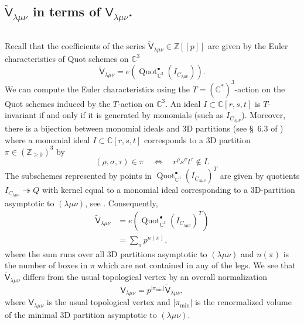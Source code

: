 \documentclass[12pt]{amsart}
\theoremstyle{definition}
\newcommand{\CC} {\mathbb{C}}          %
\newcommand{\ZZ} {\mathbb{Z}}		%
\newcommand{\sfV}{\mathsf{V}}
\newcommand{\sfVtilde}{\widetilde{\mathsf{V}}}
\newcommand{\Quot}{\operatorname{Quot}}
\newcommand{\SubSecSpace}{$\,$\vspace{0.2cm}\par } %
\begin{document}
\subsection{$\sfVtilde_{\lambda \mu \nu}$ in terms of $\sfV_{\lambda
\mu \nu}$.}\SubSecSpace 

Recall that the coefficients of the series $\sfVtilde_{\lambda \mu \nu}\in \ZZ [[p]]$ are
given by the Euler characteristics of Quot schemes on $\CC^3$
\[
\sfVtilde_{\lambda \mu \nu} =
e\left(\Quot^{\bullet}_{\CC^3}(I_{C_{\lambda \mu \nu}})\right). 
\]
We can compute the Euler characteristics using the $T=(\CC^{*})^{3}$-action on the Quot schemes induced by the $T$-action on
$\CC^{3}$. An ideal $I\subset \CC [r,s,t]$ is $T$-invariant if and
only if it is generated by monomials (such as $I_{C_{\lambda \mu \nu}}$). Moreover, there is a bijection
between monomial ideals and 3D partitions (see \S~6.3 of
\cite{Bryan-Kool-Young}) where a monomial ideal $I\subset \CC[r,s,t]$
corresponds to a 3D partition $\pi \in \left(\ZZ_{\geq 0} \right)^{3}$
by
\[
(\rho ,\sigma ,\tau )\in \pi  \quad \Longleftrightarrow\quad 
r^{\rho}s^{\sigma}t^{\tau} \notin I.
\]
The subschemes represented by points in
$\Quot^{\bullet}_{\CC^3}(I_{C_{\lambda \mu \nu}})^T$ are given by quotients $I_{C_{\lambda \mu \nu}} \twoheadrightarrow Q$ with kernel equal to a monomial ideal corresponding to a 3D-partition
asymptotic to $(\lambda \mu \nu )$, see
\cite[Defn~1]{Bryan-Kool-Young}. Consequently, 
\begin{align*}
\sfVtilde_{\lambda \mu \nu}& = e\left(\Quot^{\bullet}_{\CC^3}(I_{C_{\lambda \mu \nu}})^T\right)\\
&=\sum_{\pi} p^{n(\pi )},
\end{align*}
where the sum runs over all 3D partitions asymptotic to $(\lambda \mu
\nu )$ and $n(\pi )$ is the number of boxes in $\pi$ which are not
contained in any of the legs. We see that $\sfVtilde_{\lambda \mu
\nu}$ differs from the usual topological vertex by an overall
normalization
\[
\sfV_{\lambda \mu \nu} = p^{|\pi_{\min}|} \sfVtilde_{\lambda \mu \nu},
\]
where $\sfV_{\lambda \mu \nu }$ is the usual topological vertex
\cite[Defn~2]{Bryan-Kool-Young} and $|\pi_{\min}|$ is the renormalized
volume \cite[page~2]{Bryan-Kool-Young} of the minimal 3D partition asymptotic to $(\lambda \mu \nu )$.  
\end{document}
